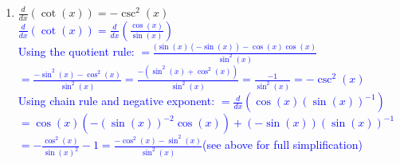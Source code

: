 \documentclass{ximera}
\begin{document}
\begin{exercise}
\begin{enumerate}
        \item $\frac{d}{dx}(\cot(x))=-\csc^2(x)$\\
        \textcolor{blue}{ $\frac{d}{dx}(\cot(x))=\frac{d}{dx}(\frac{\cos(x)}{\sin(x)})$\\
        Using the quotient rule: $=\frac{(\sin(x)(-\sin(x))-\cos(x)\cos(x)}{\sin^2(x)}$\\
        $=\frac{-\sin^2(x)-\cos^2(x)}{\sin^2(x)}=\frac{-(\sin^2(x)+\cos^2(x))}{\sin^2(x)}=\frac{-1}{\sin^2(x)}=-\csc^2(x)$\\
        Using chain rule and negative exponent: $=\frac{d}{dx}(\cos(x)(\sin(x))^{-1})$\\
        $=\cos(x)(-(\sin(x))^{-2}\cos(x))+(-\sin(x))(\sin(x))^{-1}$\\
        $=-\frac{\cos^2(x)}{\sin(x)^2}-1=\frac{-\cos^2(x)-\sin^2(x)}{\sin^2(x)}$(see above for full simplification)}
    \end{enumerate}
\end{exercise}
\end{document}
